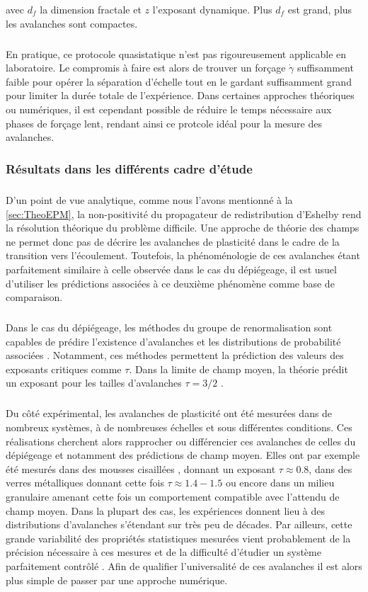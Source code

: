 \noindent avec $d_f$ la dimension fractale et $z$ l'exposant dynamique. Plus $d_f$ est grand, plus les avalanches sont compactes.

\subparagraph{}En pratique, ce protocole quasistatique n'est pas rigoureusement applicable en laboratoire. Le compromis à faire est alors de trouver un forçage $\dot{\gamma}$ suffisamment faible pour opérer la séparation d'échelle tout en le gardant suffisamment grand pour limiter la durée totale de l'expérience. Dans certaines approches théoriques ou numériques, il est cependant possible de réduire le temps nécessaire aux phases de forçage lent, rendant ainsi ce protcole idéal pour la mesure des avalanches.

\subsubsection{Résultats dans les différents cadre d'étude}

\subparagraph{}D'un point de vue analytique, comme nous l'avons mentionné à la \autoref{sec:TheoEPM}, la non-positivité du propagateur de redistribution d'Eshelby rend la résolution théorique du problème difficile. Une approche de théorie des champs ne permet donc pas de décrire les avalanches de plasticité dans le cadre de la transition vers l'écoulement. Toutefois, la phénoménologie de ces avalanches étant parfaitement similaire à celle observée dans le cas du dépiégeage, il est usuel d'utiliser les prédictions associées à ce deuxième phénomène comme base de comparaison.

\subparagraph{}Dans le cas du dépiégeage, les méthodes du groupe de renormalisation sont capables de prédire l'existence d'avalanches et les distributions de probabilité associées \cite{wiese_theory_2022}. Notamment, ces méthodes permettent la prédiction des valeurs des exposants critiques comme $\tau$. Dans la limite de champ moyen, la théorie prédit un exposant pour les tailles d'avalanches $\tau = 3/2$ \cite{le_doussal_size_2009}.

\subparagraph{}Du côté expérimental, les avalanches de plasticité ont été mesurées dans de nombreux systèmes, à de nombreuses échelles et sous différentes conditions. Ces réalisations cherchent alors rapprocher ou différencier ces avalanches de celles du dépiégeage et notamment des prédictions de champ moyen. Elles ont par exemple été mesurés dans des mousses cisaillées \cite{lauridsen_shear-induced_2002}, donnant un exposant $\tau\approx 0.8$, dans des verres métalliques \cite{sun_plasticity_2010} donnant cette fois $\tau\approx 1.4-1.5$ ou encore dans un milieu granulaire \cite{denisov_universality_2016} amenant cette fois un comportement compatible avec l'attendu de champ moyen. Dans la plupart des cas, les expériences donnent lieu à des distributions d'avalanches s'étendant sur très peu de décades. Par ailleurs, cette grande variabilité des propriétés statistiques mesurées vient probablement de la précision nécessaire à ces mesures et de la difficulté d'étudier un système parfaitement contrôlé \cite{bonn_yield_2017}. Afin de qualifier l'universalité de ces avalanches il est alors plus simple de passer par une approche numérique.

